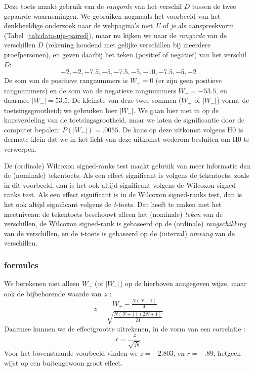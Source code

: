 \documentclass[
]{book}
\begin{document}
Deze toets maakt gebruik van de \emph{rangorde} van het verschil \(D\) tussen
de twee gepaarde waarnemingen. We gebruiken nogmaals het voorbeeld van
het denkbeeldige onderzoek naar de webpagina's met \emph{U} of \emph{je} als
aanspreekvorm
(Tabel~\ref{tab:data-uje-paired}), maar nu kijken we naar de \emph{rangorde}
van de verschillen \(D\) (rekening houdend met gelijke verschillen bij
meerdere proefpersonen), en geven daarbij het teken (positief of
negatief) van het verschil \(D\):
\[-2, -2, -7.5, -5, -7.5, -5, -10, -7.5, -5, -2\]
De som van de positieve rangnummers is \(W_+=0\) (er zijn geen positieve rangnummers)
en de som van de negatieve rangnummers \(W_-= -53.5\), en daarmee \(|W_-|=53.5\). De kleinste van
deze twee sommen (\(W_+\) of \(|W_-|\)) vormt de toetsingsgrootheid; we gebruiken hier \(|W_-|\).
We gaan
hier niet in op de kansverdeling van de toetsingsgrootheid, maar we
laten de significantie door de computer bepalen: \(P(|W_-|)=.0055\). De kans
op deze uitkomst volgens H0 is dermate klein dat we in het licht van
deze uitkomst wederom besluiten om H0 te verwerpen.

De (ordinale) Wilcoxon signed-ranks test maakt gebruik van meer
informatie dan de (nominale) tekentoets. Als een effect significant is
volgens de tekentoets, zoals in dit voorbeeld, dan is het ook altijd
significant volgens de Wilcoxon signed-ranks test. Als een effect
significant is in de Wilcoxon signed-ranks test, dan is het ook altijd
significant volgens de \emph{t}-toets. Dat heeft te maken met het meetniveau: de
tekentoets beschouwt alleen het (nominale) \emph{teken} van de verschillen, de
Wilcoxon signed-rank is gebaseerd op de (ordinale) \emph{rangschikking} van de
verschillen, en de \emph{t}-toets is gebaseerd op de (interval) \emph{omvang} van de
verschillen.

\hypertarget{formules-7}{%
\subsubsection{formules}\label{formules-7}}

We berekenen niet alleen \(W_+\) (of \(|W_-|\)) op de hierboven aangegeven wijze,
maar ook de bijbehorende waarde van \(z\) \citep{Ferg89}:
\begin{equation}
  \label{eq:Wilcoxon-signedrank-z}
  z = \frac{ W_+ - \frac{N(N+1)}{4} } { \sqrt{ \frac{N(N+1)(2N+1)}{24} } }
\end{equation}
Daarmee kunnen we de effectgrootte uitrekenen, in de vorm van een
correlatie \citep[ Eq.2.18]{Rose91}:
\begin{equation}
  \label{eq:es-z2r}
    r = \frac {z} {\sqrt{N}}
\end{equation}
Voor het bovenstaande voorbeeld vinden we
\(z=-2.803\), en \(r=-.89\), hetgeen wijst op een buitengewoon groot effect.
\end{document}
